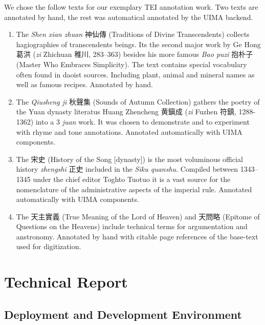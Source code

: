 \documentclass[12pt, draft]{article}
\begin{document}
We chose the follow texts for our exemplary TEI annotation work.
Two texts are annotated by hand, the rest was automatical annotated
by the UIMA backend.

\begin{enumerate}
\item The \emph{Shen xian zhuan} 神仙傳 (Traditions of Divine Transcendents)
collects hagiographies of transcendents beings.  Its the second major
work by Ge Hong 葛洪 (\emph{zi} Zhichuan 稚川, 283--363) besides his more
famous \emph{Bao puzi} 抱朴子 (Master Who Embraces Simplicity).
The text contains special vocabulary often found in daoist sources.
Including plant, animal and mineral names as well as famous recipes.
Annotated by hand.

\item The \emph{Qiusheng ji} 秋聲集 (Sounds of Autumn Collection) gathers the poetry
of the Yuan dynasty literatus Huang Zhencheng 黄鎭成 (\emph{zi} Fuzhen 符鎮, 1288-1362)
into a 3 \emph{juan} work.
It was chosen to demonstrate  and to experiment with rhyme and tone annotations.
Annotated automatically with UIMA components.

\item The 宋史 (History of the Song [dynasty]) is the most voluminous
 official history \emph{zhengshi} 正史 included in the \emph{Siku quanshu}.
Compiled between 1343--1345 under the chief editor Toghto Tuotuo 
it is a vast source for the nomenclature  of the administrative aspects
of the imperial rule.
Annotated automatically with UIMA components.

\item The 天主實義 (True Meaning of the Lord of Heaven) and 天問略 (Epitome of Questions on the Heavens) include technical terms for argumentation and anstronomy. 
Annotated by hand with citable page references of the base-text used for digitization. 


\end{enumerate}
 
\section{Technical Report}

\subsection{Deployment and Development Environment}
\end{document}
